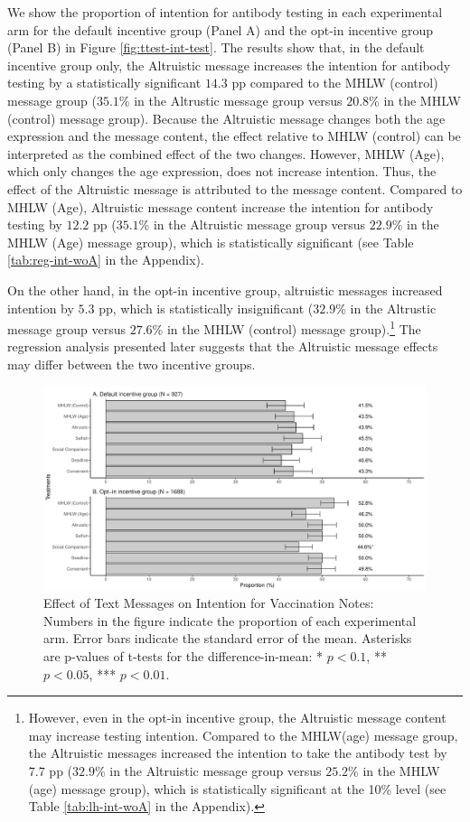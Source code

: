 \documentclass[
]{article}
\begin{document}
We show the proportion of intention for antibody testing in each experimental arm for the default incentive group (Panel A) and the opt-in incentive group (Panel B) in Figure \ref{fig:ttest-int-test}. The results show that, in the default incentive group only, the Altruistic message increases the intention for antibody testing by a statistically significant \(14.3\) pp compared to the MHLW (control) message group (\(35.1\)\% in the Altrustic message group versus \(20.8\)\% in the MHLW (control) message group). Because the Altruistic message changes both the age expression and the message content, the effect relative to MHLW (control) can be interpreted as the combined effect of the two changes. However, MHLW (Age), which only changes the age expression, does not increase intention. Thus, the effect of the Altruistic message is attributed to the message content. Compared to MHLW (Age), Altruistic message content increase the intention for antibody testing by \(12.2\) pp (\(35.1\)\% in the Altruistic message group versus \(22.9\)\% in the MHLW (Age) message group), which is statistically significant (see Table \ref{tab:reg-int-woA} in the Appendix).

On the other hand, in the opt-in incentive group, altruistic messages increased intention by \(5.3\) pp, which is statistically insignificant (\(32.9\)\% in the Altrustic message group versus \(27.6\)\% in the MHLW (control) message group).\footnote{However, even in the opt-in incentive group, the Altruistic message content may increase testing intention. Compared to the MHLW(age) message group, the Altruistic messages increased the intention to take the antibody test by \(7.7\) pp (\(32.9\)\% in the Altruistic message group versus \(25.2\)\% in the MHLW (age) message group), which is statistically significant at the 10\% level (see Table \ref{tab:lh-int-woA} in the Appendix).} The regression analysis presented later suggests that the Altruistic message effects may differ between the two incentive groups.

\begin{figure}
\centering
\includegraphics{discussion-paper_files/figure-latex/ttest-int-vacc-1.pdf}
\caption{\label{fig:ttest-int-vacc}Effect of Text Messages on Intention for Vaccination Notes: Numbers in the figure indicate the proportion of each experimental arm. Error bars indicate the standard error of the mean. Asterisks are p-values of t-tests for the difference-in-mean: * \(p < 0.1\), ** \(p < 0.05\), *** \(p < 0.01\).}
\end{figure}
\end{document}
